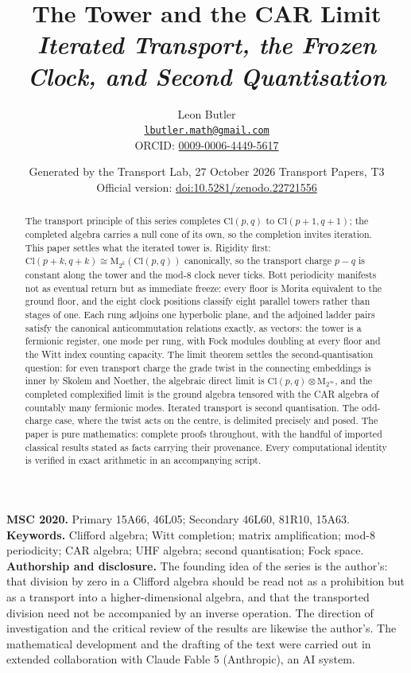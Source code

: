 \documentclass[11pt]{article}
\title{\bfseries The Tower and the CAR Limit\\[4pt]\large\itshape Iterated Transport, the Frozen Clock, and Second Quantisation}
\author{Leon Butler\\ \normalsize\href{mailto:lbutler.math@gmail.com}{\texttt{lbutler.math@gmail.com}}\\ \normalsize ORCID: \href{https://orcid.org/0009-0006-4449-5617}{0009-0006-4449-5617}}
\date{Generated by the Transport Lab, 27 October 2026 \textperiodcentered{} Transport Papers, T3\\[3pt]\small Official version: \href{https://doi.org/10.5281/zenodo.22721556}{doi:10.5281/zenodo.22721556}}
\theoremstyle{definition}
\theoremstyle{plain}
\providecommand{\Cl}{}\renewcommand{\Cl}{\mathrm{Cl}}
\providecommand{\Mat}{}\renewcommand{\Mat}{\mathrm{M}}
\begin{document}
\maketitle
\begin{abstract}
\normalsize
The transport principle of this series completes $\Cl(p,q)$ to $\Cl(p{+}1,q{+}1)$; the completed algebra carries a null cone of its own, so the completion invites iteration. This paper settles what the iterated tower is. Rigidity first: $\Cl(p{+}k, q{+}k) \cong \Mat_{2^k}(\Cl(p,q))$ canonically, so the transport charge $p - q$ is constant along the tower and the mod-8 clock never ticks. Bott periodicity manifests not as eventual return but as immediate freeze: every floor is Morita equivalent to the ground floor, and the eight clock positions classify eight parallel towers rather than stages of one. Each rung adjoins one hyperbolic plane, and the adjoined ladder pairs satisfy the canonical anticommutation relations exactly, as vectors: the tower is a fermionic register, one mode per rung, with Fock modules doubling at every floor and the Witt index counting capacity. The limit theorem settles the second-quantisation question: for even transport charge the grade twist in the connecting embeddings is inner by Skolem and Noether, the algebraic direct limit is $\Cl(p,q) \otimes \Mat_{2^\infty}$, and the completed complexified limit is the ground algebra tensored with the CAR algebra of countably many fermionic modes. Iterated transport is second quantisation. The odd-charge case, where the twist acts on the centre, is delimited precisely and posed. The paper is pure mathematics: complete proofs throughout, with the handful of imported classical results stated as facts carrying their provenance. Every computational identity is verified in exact arithmetic in an accompanying script.
\end{abstract}
\medskip
\noindent\textbf{MSC 2020.} Primary 15A66, 46L05; Secondary 46L60, 81R10, 15A63.\\
\textbf{Keywords.} Clifford algebra; Witt completion; matrix amplification; mod-8 periodicity; CAR algebra; UHF algebra; second quantisation; Fock space.
\newpage
\noindent \textbf{Authorship and disclosure. }The founding idea of the series is the author's: that division by zero in a Clifford algebra should be read not as a prohibition but as a transport into a higher-dimensional algebra, and that the transported division need not be accompanied by an inverse operation. The direction of investigation and the critical review of the results are likewise the author's. The mathematical development and the drafting of the text were carried out in extended collaboration with Claude Fable 5 (Anthropic), an AI system.
\end{document}

